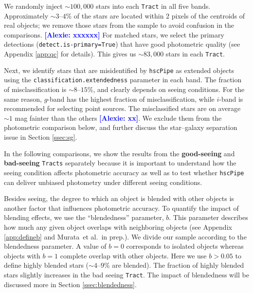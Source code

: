 \documentclass[useamsfonts]{pasj01}
\def\etal{{\ et al.~}}
\newcommand{\alexie}[1]{\textcolor{blue}{\textbf{[Alexie: #1]}}}
\def\hscpipe{\texttt{hscPipe}}
\def\synpipe{\texttt{SynPipe}}
\def\tract{\texttt{Tract}}
\def\tracts{\texttt{Tracts}}
\begin{document}
    We randomly inject ${\sim}100,000$ stars into each \tract{} in all
    five bands. Approximately ${\sim}3$--$4$\% of the stars are located within 2 pixels of the centroids
    of real objects; we remove those stars from the sample to avoid confusion in the comparisons. \alexie{xxxxxx}
    For matched stars, we select the primary detections
    (\texttt{detect.is-primary=True}) that have good photometric quality
    (see Appendix \ref{app:qc} for details).
    This gives us ${\sim}83,000$ stars in each \tract{}.

    Next, we identify stars that are misidentified by \hscpipe{} as extended
    objects using the \texttt{classification.extendedness} parameter in each band.
    The fraction of misclassification is ${\sim}8$--$15$\%, and clearly depends on
    seeing conditions.
    For the same reason, $g$-band has the highest fraction of misclassification,
    while $i$-band is recommended for selecting point sources.
    The misclassified stars are on average ${\sim}1$ mag fainter than the others \alexie{xx}.
    We exclude them from the photometric comparison below, and further discuss
    the star--galaxy separation issue in Section \ref{ssec:sg}.

    In the following comparisons, we show the results from the
    \textbf{good-seeing} and \textbf{bad-seeing} \tracts{} separately because it
    is important to understand how the seeing condition affects photometric accuracy as well as to test whether \hscpipe{} can deliver unbiased photometry under different  seeing conditions.
    
    Besides seeing, the degree to which an object is blended with other objects  is another factor that influences photometric accuracy. To quantify the impact of blending effects, we use the ``blendedness'' parameter, $b$. This parameter describes how  much any given object overlaps with neighboring objects (see Appendix \ref{app:defineb} and Murata\etal in prep.). We divide our sample  according to the  blendedness parameter. A value of $b=0$ corresponds to isolated objects whereas  objects with $b=1$ complete overlap with other objects. Here we use $b>0.05$ to define highly blended stars (${\sim}4$--$9$\% are blended).
    The fraction of highly blended stars slightly increases in the bad seeing \tract{}. The
    impact of blendedness will be discussed more in Section \ref{ssec:blendedness}.
\end{document}
